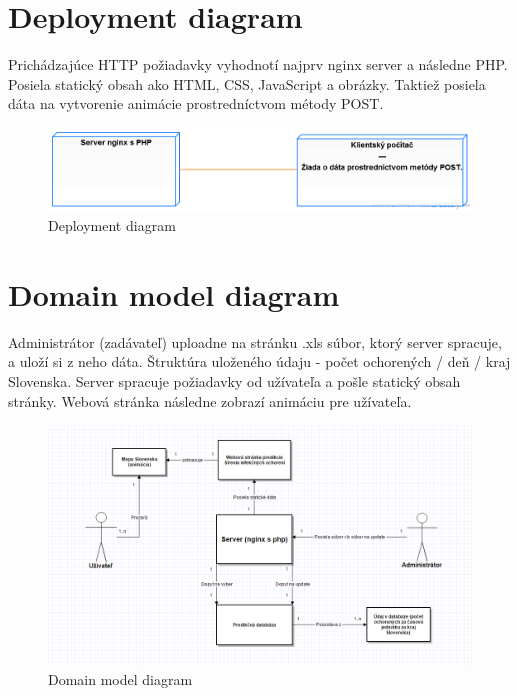 \documentclass[12pt,a4paper]{report}
\begin{document}
\section[Deployment diagram]{\rmfamily\bfseries
	Deployment diagram}
Prichádzajúce HTTP požiadavky vyhodnotí najprv nginx server a následne PHP. Posiela statický obsah ako HTML, CSS, JavaScript a obrázky. Taktiež posiela dáta na vytvorenie animácie prostredníctvom métody POST.
\begin{figure}[htb]
\includegraphics[scale=0.5]{deployment}
\caption[Deployment diagram]{Deployment diagram}
 \label{fig:Deployment diagram}
\end{figure}


\section[Domain model diagram]{\rmfamily\bfseries
	Domain model diagram}
Administrátor (zadávateľ) uploadne na stránku .xls súbor, ktorý server spracuje, a uloží si z neho dáta. Štruktúra uloženého údaju - počet ochorených / deň / kraj Slovenska. Server spracuje požiadavky od užívateľa a pošle statický obsah stránky. Webová stránka následne zobrazí animáciu pre užívateľa.
\begin{figure}[htb]
\includegraphics[scale=0.5]{Domain_model_diagram}
\caption[Domain model diagram]{Domain model diagram}
 \label{fig:Domain model diagram}
\end{figure}
\end{document}
